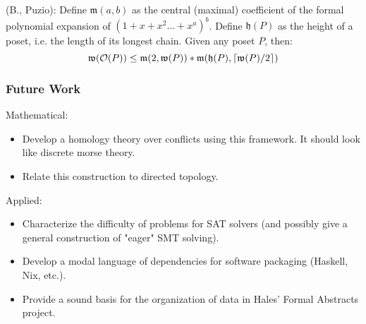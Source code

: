 \documentclass{beamer}
\newcommand{\Oc}{\mathcal{O}}
\newcommand{\Mf}{\mathfrak{m}}
\newcommand{\Wf}{\mathfrak{w}}
\newcommand{\Hf}{\mathfrak{h}}
\DeclarePairedDelimiter\ceil{\lceil}{\rceil}
\begin{document}
\begin{frame}
\begin{theorem}
(B., Puzio): Define \(\Mf(a,b)\) as the central (maximal) coefficient of the formal polynomial expansion of \((1 + x + x^2 ... + x^a)^b\). Define \(\Hf(P)\) as the height of a poset, i.e. the length of its longest chain. Given any poset \(P\), then:
\begin{equation*}
 \Wf(\Oc(P)) \le \Mf(2,\Wf(P)) * \Mf(\Hf(P),\ceil{\Wf(P)/2})
\end{equation*}
\end{theorem}
\end{frame}

\begin{frame}
\frametitle{Future Work}
Mathematical:
\begin{itemize}
\item Develop a homology theory over conflicts using this framework. It should look like discrete morse theory.
\item Relate this construction to directed topology.
\end{itemize}

Applied:
\begin{itemize}
\item Characterize the difficulty of problems for SAT solvers (and possibly give a general construction of "eager" SMT solving).
\item Develop a modal language of dependencies for software packaging (Haskell, Nix, etc.).
\item Provide a sound basis for the organization of data in Hales' Formal Abstracts project. 
\end{itemize}

\end{frame}
\end{document}
